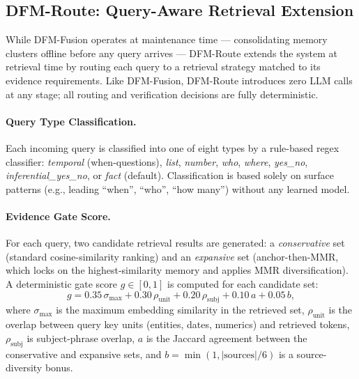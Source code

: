 \subsection{DFM-Route: Query-Aware Retrieval Extension}
\label{sec:dfm-route}

While DFM-Fusion operates at maintenance time --- consolidating memory clusters offline before any query arrives --- DFM-Route extends the system at retrieval time by routing each query to a retrieval strategy matched to its evidence requirements.
Like DFM-Fusion, DFM-Route introduces zero LLM calls at any stage; all routing and verification decisions are fully deterministic.

\paragraph{Query Type Classification.}
Each incoming query is classified into one of eight types by a rule-based regex classifier: \textit{temporal} (when-questions), \textit{list}, \textit{number}, \textit{who}, \textit{where}, \textit{yes\_no}, \textit{inferential\_yes\_no}, or \textit{fact} (default).
Classification is based solely on surface patterns (e.g., leading ``when'', ``who'', ``how many'') without any learned model.

\paragraph{Evidence Gate Score.}
For each query, two candidate retrieval results are generated: a \textit{conservative} set (standard cosine-similarity ranking) and an \textit{expansive} set (anchor-then-MMR, which locks on the highest-similarity memory and applies MMR diversification).
A deterministic gate score $g \in [0,1]$ is computed for each candidate set:
\begin{equation}
    g = 0.35\,\sigma_{\max} + 0.30\,\rho_{\text{unit}} + 0.20\,\rho_{\text{subj}} + 0.10\,a + 0.05\,b,
    \label{eq:gate}
\end{equation}
where $\sigma_{\max}$ is the maximum embedding similarity in the retrieved set, $\rho_{\text{unit}}$ is the overlap between query key units (entities, dates, numerics) and retrieved tokens, $\rho_{\text{subj}}$ is subject-phrase overlap, $a$ is the Jaccard agreement between the conservative and expansive sets, and $b = \min(1, |\text{sources}|/6)$ is a source-diversity bonus.

